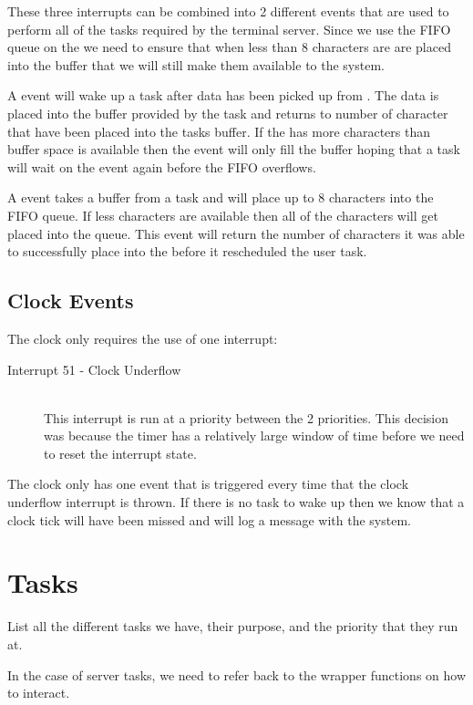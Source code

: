 \documentclass[pdftex,10pt,a4paper]{article}
\begin{document}
These three interrupts can be combined into 2 different events that are used to
perform all of the tasks required by the terminal server. Since we use the FIFO
queue on the  we need to ensure that when less than 8 characters are
are placed into the buffer that we will still make them available to the system.

A  event will wake up a task after data has been picked up
from . The data is placed into the buffer provided by the task and
returns to number of character that have been placed into the tasks buffer. If
the  has more characters than buffer space is available then the event
will only fill the buffer hoping that a task will wait on the event again
before the FIFO overflows.

A  event takes a buffer from a task and will place up to 8
characters into the  FIFO queue. If less characters are available then
all of the characters will get placed into the queue. This event will return
the number of characters it was able to successfully place into the 
before it rescheduled the user task.

\subsection*{Clock Events}

The clock only requires the use of one interrupt:
\begin{description}
\item [Interrupt 51 - Clock Underflow] \hfill \\
	This interrupt is run at a priority between the 2  priorities.
	This decision was because the timer has a relatively large window of
	time before we need to reset the interrupt state.
\end{description}

The clock only has one event that is triggered every time that the clock
underflow interrupt is thrown. If there is no task to wake up then we know
that a clock tick will have been missed and will log a message with the system.


\section*{Tasks}

List all the different tasks we have, their purpose, and the priority
that they run at.

In the case of server tasks, we need to refer back to the wrapper
functions on how to interact.
\end{document}
